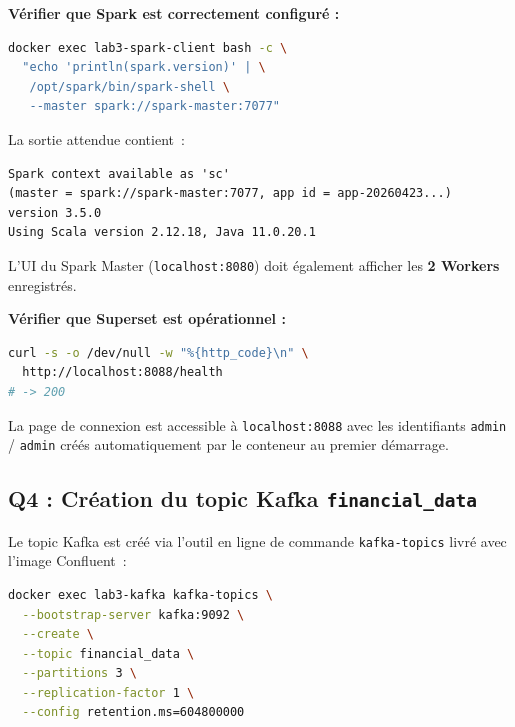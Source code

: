 \documentclass{RapportINPTCLOUD}
\begin{document}
\textbf{V\'{e}rifier que Spark est correctement configur\'{e} :}
\begin{lstlisting}[style=code, language=bash]
docker exec lab3-spark-client bash -c \
  "echo 'println(spark.version)' | \
   /opt/spark/bin/spark-shell \
   --master spark://spark-master:7077"
\end{lstlisting}
La sortie attendue contient~:
\begin{lstlisting}[style=code]
Spark context available as 'sc'
(master = spark://spark-master:7077, app id = app-20260423...)
version 3.5.0
Using Scala version 2.12.18, Java 11.0.20.1
\end{lstlisting}
L'UI du Spark Master (\texttt{localhost:8080}) doit \'{e}galement afficher les \textbf{2 Workers} enregistr\'{e}s.

\textbf{V\'{e}rifier que Superset est op\'{e}rationnel :}
\begin{lstlisting}[style=code, language=bash]
curl -s -o /dev/null -w "%{http_code}\n" \
  http://localhost:8088/health
# -> 200
\end{lstlisting}
La page de connexion est accessible \`{a} \texttt{localhost:8088} avec les identifiants \texttt{admin} / \texttt{admin} cr\'{e}\'{e}s automatiquement par le conteneur au premier d\'{e}marrage.

\subsection{Q4 : Cr\'{e}ation du topic Kafka \texttt{financial\_data}}

Le topic Kafka est cr\'{e}\'{e} via l'outil en ligne de commande \texttt{kafka-topics} livr\'{e} avec l'image Confluent~:

\begin{lstlisting}[style=code, language=bash]
docker exec lab3-kafka kafka-topics \
  --bootstrap-server kafka:9092 \
  --create \
  --topic financial_data \
  --partitions 3 \
  --replication-factor 1 \
  --config retention.ms=604800000
\end{lstlisting}
\end{document}
